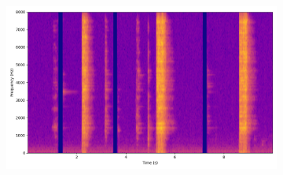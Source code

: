 \begin{figure}[!htbp]
\begin{subfigure}[b]{0.185\textwidth}
    \end{subfigure}
    \begin{subfigure}[b]{0.185\textwidth}
        \centering
        \includegraphics[width=\textwidth]{plots/onepeace_best_sdri/onepeace target_spectrogram.png}
    \end{subfigure}


\end{figure}
